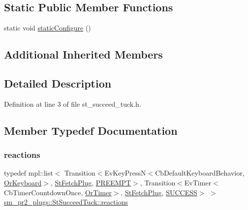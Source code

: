 \subsection*{Static Public Member Functions}
\begin{DoxyCompactItemize}
\item 
static void \hyperlink{structsm__pr2__plugs_1_1StSucceedTuck_a2578c44b2fa3443560def76f6d2bdef3}{static\+Configure} ()
\end{DoxyCompactItemize}
\subsection*{Additional Inherited Members}


\subsection{Detailed Description}


Definition at line 3 of file st\+\_\+succeed\+\_\+tuck.\+h.



\subsection{Member Typedef Documentation}
\mbox{\label{structsm__pr2__plugs_1_1StSucceedTuck_a5f4cdc033699ffd5e4c7f36e690d245a}} 
\subsubsection{\texorpdfstring{reactions}{reactions}}
{\footnotesize\ttfamily typedef mpl\+::list$<$ Transition$<$Ev\+Key\+PressN$<$Cb\+Default\+Keyboard\+Behavior, \hyperlink{classsm__pr2__plugs_1_1OrKeyboard}{Or\+Keyboard}$>$, \hyperlink{structsm__pr2__plugs_1_1StFetchPlug}{St\+Fetch\+Plug}, \hyperlink{classPREEMPT}{P\+R\+E\+E\+M\+PT}$>$, Transition$<$Ev\+Timer$<$Cb\+Timer\+Countdown\+Once, \hyperlink{classsm__pr2__plugs_1_1OrTimer}{Or\+Timer}$>$, \hyperlink{structsm__pr2__plugs_1_1StFetchPlug}{St\+Fetch\+Plug}, \hyperlink{classSUCCESS}{S\+U\+C\+C\+E\+SS}$>$ $>$ \hyperlink{structsm__pr2__plugs_1_1StSucceedTuck_a5f4cdc033699ffd5e4c7f36e690d245a}{sm\+\_\+pr2\+\_\+plugs\+::\+St\+Succeed\+Tuck\+::reactions}}



